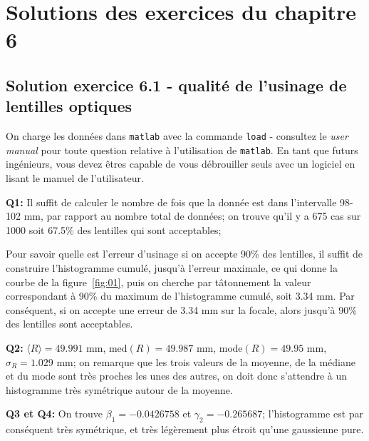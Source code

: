 \newcommand{\dd}{\ensuremath{\text{d}}}

\section{Solutions des exercices du chapitre 6}

\subsection*{Solution exercice 6.1 - qualité de l'usinage de lentilles optiques}


On charge les données dans \texttt{matlab} avec la commande \texttt{load} - consultez le \textit{user manual} pour toute question relative à l'utilisation de \texttt{matlab}. En tant que futurs ingénieurs, vous devez êtres capable de vous débrouiller seuls avec un logiciel en lisant le manuel de l'utilisateur.

\textbf{Q1:} Il suffit de calculer le nombre de fois que la donnée est dans l'intervalle 98-102 mm, par rapport au nombre total de données; on trouve qu'il y a 675 cas sur 1000 soit 67.5\% des lentilles qui sont acceptables;

Pour savoir quelle est l'erreur d'usinage si on accepte 90\% des lentilles, il suffit de construire l'histogramme cumulé, jusqu'à l'erreur maximale, ce qui donne la courbe de la figure~\ref{fig:01}, puis on cherche par tâtonnement la valeur correspondant à 90\% du maximum de l'histogramme cumulé, soit 3.34 mm. Par conséquent, si on accepte une erreur de 3.34 mm sur la focale, alors jusqu'à 90\% des lentilles sont acceptables.

\textbf{Q2:} $\langle R\rangle=49.991$ mm, $\text{med}(R)=49.987$ mm, $\text{mode}(R)=49.95$ mm, $\sigma_R=1.029$ mm; on remarque que les trois valeurs de la moyenne, de la médiane et du mode sont très proches les unes des autres, on doit donc s'attendre à un histogramme très symétrique autour de la moyenne.

\textbf{Q3 et Q4:} On trouve $\beta_1=-0.0426758$ et $\gamma_2=-0.265687$; l'histogramme est par conséquent très symétrique, et très légèrement plus étroit qu'une gaussienne pure.

